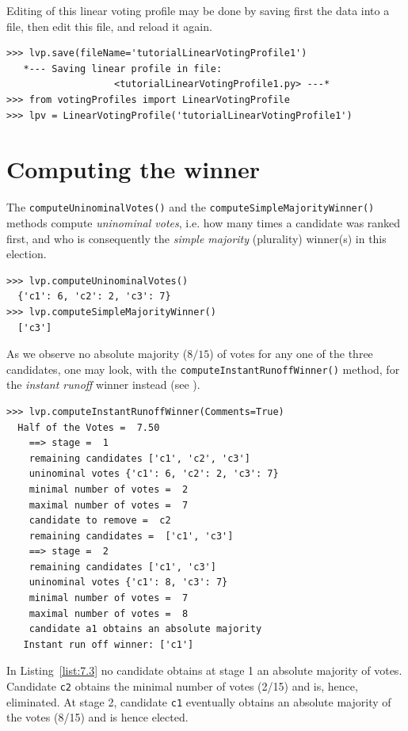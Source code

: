 Editing of this linear voting profile may be done by saving first the data into a file, then edit this file, and reload it again.
\begin{lstlisting}
>>> lvp.save(fileName='tutorialLinearVotingProfile1')
   *--- Saving linear profile in file:
                   <tutorialLinearVotingProfile1.py> ---*
>>> from votingProfiles import LinearVotingProfile
>>> lpv = LinearVotingProfile('tutorialLinearVotingProfile1')
\end{lstlisting}

\section{Computing the winner}
\label{sec:7.2}

The \texttt{computeUninominalVotes()} and the \texttt{computeSimpleMajority\-Winner()} methods compute \emph{uninominal votes}, i.e. how many times a candidate was ranked first, and who is consequently the \emph{simple majority} (plurality) winner(s) in this election.
\begin{lstlisting}
>>> lvp.computeUninominalVotes()
  {'c1': 6, 'c2': 2, 'c3': 7}
>>> lvp.computeSimpleMajorityWinner()
  ['c3']
\end{lstlisting}

As we observe no absolute majority ($8/15$) of votes for any one of the three candidates, one may look, with the \texttt{computeInstantRunoffWinner()} method, for the \emph{instant runoff} winner instead (see \citealp{ADT-L2}).
\begin{lstlisting}[caption={Example Instant Run Off Winner},label=list:7.3]
>>> lvp.computeInstantRunoffWinner(Comments=True)
  Half of the Votes =  7.50
    ==> stage =  1
	remaining candidates ['c1', 'c2', 'c3']
	uninominal votes {'c1': 6, 'c2': 2, 'c3': 7}
	minimal number of votes =  2
	maximal number of votes =  7
	candidate to remove =  c2
	remaining candidates =  ['c1', 'c3']
    ==> stage =  2
	remaining candidates ['c1', 'c3']
	uninominal votes {'c1': 8, 'c3': 7}
	minimal number of votes =  7
	maximal number of votes =  8
	candidate a1 obtains an absolute majority
   Instant run off winner: ['c1']
 \end{lstlisting}

In Listing~\vref{list:7.3} no candidate obtains at stage 1 an absolute majority of votes. Candidate \texttt{c2} obtains the minimal number of votes (2/15) and is, hence, eliminated. At stage 2, candidate \texttt{c1} eventually obtains an absolute majority of the votes (8/15) and is hence elected.

